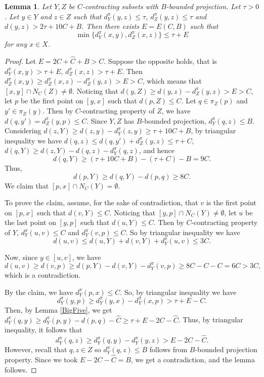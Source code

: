 \documentclass{amsart}
\numberwithin{thm}{section}
\numberwithin{figure}{section}
\newtheorem{lem}[thm]{Lemma}
\theoremstyle{definition}
\theoremstyle{definition}
\theoremstyle{remark}
\numberwithin{equation}{section}
\theoremstyle{plain}
\begin{document}
\begin{lem}\label{projToAxis}
	Let $Y, Z$ be $C$-contracting subsets with $B$-bounded projection. Let $\tau > 0$. Let $y\in Y$ and $z\in Z$ such that $d^\pi_Y(y, z)\le \tau$, $d^\pi_Z(y, z)\le \tau$ and $d(y, z) > 2\tau + 10C + B$. Then there exists $E = E(C, B)$ such that $$\min\{d^\pi_Y(x, y), d^{\pi}_Z(x, z)\} \le \tau + E$$ for any $x\in X$. 
\end{lem}
\begin{proof}
	Let $E = 2C + \hat C + B >C$. Suppose the opposite holds, that is $d^\pi_Y(x, y) > \tau + E$, $d^{\pi}_Z(x, z) > \tau + E$. Then $d^{\pi}_Z(x, y) \ge d^\pi_Z(x, z)- d^\pi_Z(y, z) > E > C$, which means that $[x, y]\cap N_C(Z)\neq\emptyset$. Noticing that $d(y, Z) \ge d(y, z) - d^\pi_Z(y, z) > E > C$, let $p$ be the first point on $[y, x]$ such that $d(p, Z)\le C$. Let $q \in \pi_Z(p)$ and $y' \in \pi_Z(y)$. Then by $C$-contracting property of $Z$, we have $d(q, y') = d^\pi_Z(y, p) \le C$. Since $Y, Z$ has $B$-bounded projection, $d^\pi_Y(q, z) \le B$. Considering $d(z, Y) \ge d(z, y) - d^{\pi}_Y(z, y) \ge \tau + 10C + B$, by triangular inequality we have $d(q, z) \le d(q, y') + d^\pi_Z(y, z) \le \tau + C$, $d(q,Y) \geq d(z,Y) - d(q,z) - d^\pi_Y(q,z)$, and hence $$d(q, Y) \ge (\tau + 10C + B) - (\tau + C) - B = 9C.$$ Thus, $$d(p, Y) \ge d(q, Y) - d(p, q) \ge 8C.$$ We claim that $[p, x]\cap N_C(Y) = \emptyset$.

    To prove the claim, assume, for the sake of contradiction, that $v$ is the first point on $[p,x]$ such that $d(v, Y) \le C$. Noticing that $[y, p]\cap N_C(Y)\neq \emptyset$, let $u$ be the last point on $[y, p]$ such that $d(u, Y) \le C$. Then by $C$-contracting property of $Y$, $d^\pi_Y(u, v)\le C$ and $d^\pi_Y(v, p)\le C$. So by triangular inequality we have $$d(u, v) \le d(u, Y) + d(v, Y) + d^\pi_Y(u, v) \le 3C.$$ 
    
    Now, since $y\in [u, v]$, we have $$d(u, v) \ge d(v, p) \ge d(p, Y) - d(v, Y) - d^\pi_Y(v, p) \ge 8C - C - C = 6C > 3C,$$ which is a contradiction.

    By the claim, we have $d^\pi_Y(p, x) \le C$. So, by triangular inequality we have $$d^\pi_Y(y, p)\ge d^\pi_Y(y,x) - d^\pi_Y(x,p) > \tau + E - C.$$ Then, by Lemma \ref{BigFive}, we get $d^\pi_Y(q, y) \ge d^\pi_Y(p, y) - d(p, q) - \hat{C} \ge \tau + E - 2C - \hat C$. Thus, by triangular inequality, it follows that $$d^\pi_Y(q, z)\ge d^\pi_Y(q, y)-d^\pi_Y(y,z) > E - 2C - \hat C.$$ However, recall that $q,z\in Z$ so $d^\pi_Y(q, z)\le B$ follows from $B$-bounded projection property. Since we took $E - 2C - \hat C = B$, we get a contradiction, and the lemma follows.
\end{proof}
\end{document}
